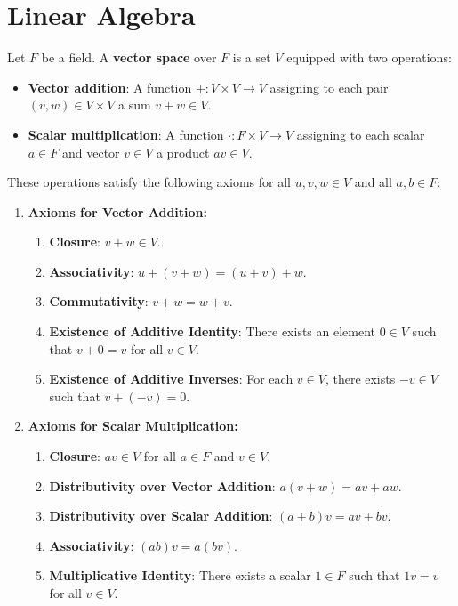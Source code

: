 \documentclass[../main.tex]{subfiles}
\begin{document}
\section{Linear Algebra}



\begin{definition}
    Let \( F \) be a field. A \textbf{vector space} over \( F \) is a set \( V \) equipped with two operations:
    \begin{itemize}
        \item \textbf{Vector addition}: A function \( +: V \times V \to V \) assigning to each pair \( (v, w) \in V \times V \) a sum \( v + w \in V \).
        \item \textbf{Scalar multiplication}: A function \( \cdot: F \times V \to V \) assigning to each scalar \( a \in F \) and vector \( v \in V \) a product \( av \in V \).
    \end{itemize}
    These operations satisfy the following axioms for all \( u, v, w \in V \) and all \( a, b \in F \):
        
    \begin{enumerate}
        \item \textbf{Axioms for Vector Addition:}
        \begin{enumerate}
            \item \textbf{Closure}: \( v + w \in V \).
            \item \textbf{Associativity}: \( u + (v + w) = (u + v) + w \).
            \item \textbf{Commutativity}: \( v + w = w + v \).
            \item \textbf{Existence of Additive Identity}: There exists an element \( 0 \in V \) such that \( v + 0 = v \) for all \( v \in V \).
            \item \textbf{Existence of Additive Inverses}: For each \( v \in V \), there exists \( -v \in V \) such that \( v + (-v) = 0 \).
        \end{enumerate}
            
        \item \textbf{Axioms for Scalar Multiplication:}
        \begin{enumerate}
                \item \textbf{Closure}: \( av \in V \) for all \( a \in F \) and \( v \in V \).
                \item \textbf{Distributivity over Vector Addition}: \( a(v + w) = av + aw \).
                \item \textbf{Distributivity over Scalar Addition}: \( (a + b)v = av + bv \).
                \item \textbf{Associativity}: \( (ab)v = a(bv) \).
                \item \textbf{Multiplicative Identity}: There exists a scalar \( 1 \in F \) such that \( 1v = v \) for all \( v \in V \).
        \end{enumerate}
    \end{enumerate}
    
    \end{definition}
    
\end{document}
